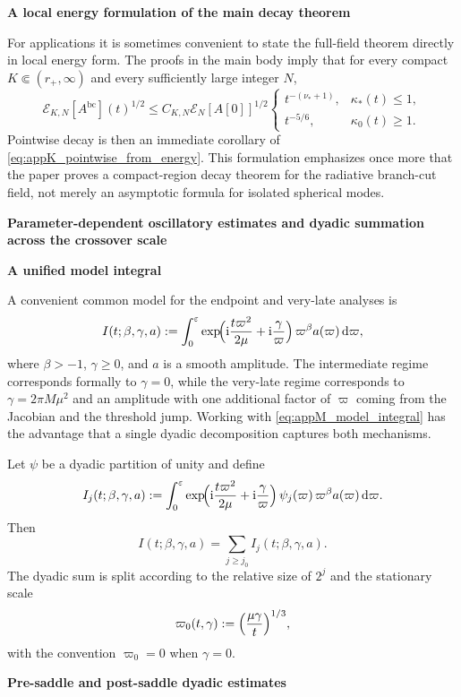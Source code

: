 \documentclass[12pt]{article}
\numberwithin{equation}{section}
\theoremstyle{plain}
\theoremstyle{definition}
\theoremstyle{remark}
\newcommand{\ii}{\mathrm i}
\newcommand{\dd}{\mathrm d}
\newcommand{\bc}{\mathrm{bc}}
\newcommand{\vp}{\varpi}
\newcommand{\kap}{\kappa}
\newcommand{\eps}{\varepsilon}
\newcommand{\appheading}[1]{\par\medskip\noindent\textbf{#1}\par\smallskip\noindent}
\newcommand{\applabelheading}[2]{\par\medskip\phantomsection\label{#2}\noindent\textbf{#1}\par\smallskip\noindent}
\begin{document}
\appheading{A local energy formulation of the main decay theorem}

For applications it is sometimes convenient to state the full-field theorem directly in local energy form.  The proofs in the main body imply that for every compact $K\Subset(r_+,\infty)$ and every sufficiently large integer $N$,
\[
   \mathcal E_{K,N}[A^{\bc}](t)^{1/2}
   \le
   C_{K,N}\mathcal E_N[A[0]]^{1/2}
   \begin{cases}
      t^{-(\nu_*+1)},& \kap_*(t)\le1,\\[0.4ex]
      t^{-5/6},& \kap_0(t)\ge1.
   \end{cases}
\]
Pointwise decay is then an immediate corollary of \eqref{eq:appK_pointwise_from_energy}.  This formulation emphasizes once more that the paper proves a compact-region decay theorem for the radiative branch-cut field, not merely an asymptotic formula for isolated spherical modes.

\applabelheading{Parameter-dependent oscillatory estimates and dyadic summation across the crossover scale}{app:dyadic_phase}
\appheading{A unified model integral}

A convenient common model for the endpoint and very-late analyses is
\begin{equation}\label{eq:appM_model_integral}
   I(t;\beta,\gamma,a)
   :=
   \int_0^\eps
      \exp\!\Bigl(
         \ii\frac{t\vp^2}{2\mu}+\ii\frac{\gamma}{\vp}
      \Bigr)\,
      \vp^\beta a(\vp)\,\dd\vp,
\end{equation}
where $\beta>-1$, $\gamma\ge0$, and $a$ is a smooth amplitude.  The intermediate regime corresponds formally to $\gamma=0$, while the very-late regime corresponds to $\gamma=2\pi M\mu^2$ and an amplitude with one additional factor of $\vp$ coming from the Jacobian and the threshold jump.  Working with \eqref{eq:appM_model_integral} has the advantage that a single dyadic decomposition captures both mechanisms.

Let $\psi$ be a dyadic partition of unity and define
\[
   I_j(t;\beta,\gamma,a)
   :=
   \int_0^\eps
      \exp\!\Bigl(
         \ii\frac{t\vp^2}{2\mu}+\ii\frac{\gamma}{\vp}
      \Bigr)\,
      \psi_j(\vp)\,
      \vp^\beta a(\vp)\,\dd\vp.
\]
Then
\[
   I(t;\beta,\gamma,a)=\sum_{j\ge j_0}I_j(t;\beta,\gamma,a).
\]
The dyadic sum is split according to the relative size of $2^j$ and the stationary scale
\[
   \vp_0(t,\gamma):=\Bigl(\frac{\mu\gamma}{t}\Bigr)^{1/3},
\]
with the convention $\vp_0=0$ when $\gamma=0$.

\appheading{Pre-saddle and post-saddle dyadic estimates}
\end{document}
